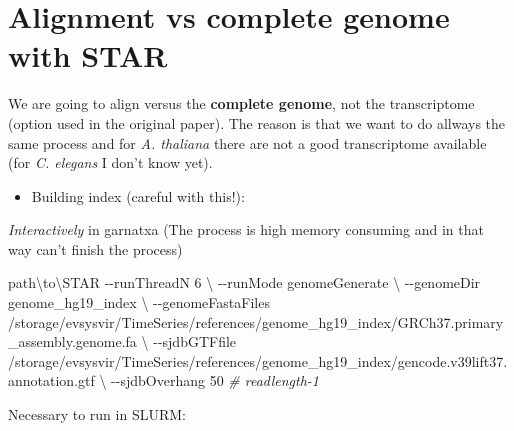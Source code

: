 \documentclass[
]{book}
\newenvironment{Shaded}{\begin{snugshade}}{\end{snugshade}}
\newcommand{\AttributeTok}[1]{\textcolor[rgb]{0.77,0.63,0.00}{#1}}
\newcommand{\CommentTok}[1]{\textcolor[rgb]{0.56,0.35,0.01}{\textit{#1}}}
\newcommand{\DataTypeTok}[1]{\textcolor[rgb]{0.13,0.29,0.53}{#1}}
\newcommand{\ExtensionTok}[1]{#1}
\newcommand{\NormalTok}[1]{#1}
\providecommand{\tightlist}{%
  \setlength{\itemsep}{0pt}\setlength{\parskip}{0pt}}
\begin{document}
\hypertarget{alignment-vs-complete-genome-with-star}{%
\section{Alignment vs complete genome with STAR}\label{alignment-vs-complete-genome-with-star}}

We are going to align versus the \textbf{complete genome}, not the transcriptome (option used in the original paper). The reason is that we want to do allways the same process and for \emph{A. thaliana} there are not a good transcriptome available (for \emph{C. elegans} I don't know yet).

\begin{itemize}
\tightlist
\item
  Building index (careful with this!):
\end{itemize}

\emph{Interactively} in garnatxa (The process is high memory consuming and in that way can't finish the process)

\begin{Shaded}
\begin{Highlighting}[]
\ExtensionTok{path\textbackslash{}to\textbackslash{}STAR} \AttributeTok{{-}{-}runThreadN}\NormalTok{ 6 }\DataTypeTok{\textbackslash{}}
\NormalTok{{-}{-}runMode genomeGenerate }\DataTypeTok{\textbackslash{}}
\NormalTok{{-}{-}genomeDir genome\_hg19\_index }\DataTypeTok{\textbackslash{}}
\NormalTok{{-}{-}genomeFastaFiles /storage/evsysvir/TimeSeries/references/genome\_hg19\_index/GRCh37.primary\_assembly.genome.fa }\DataTypeTok{\textbackslash{}}
\NormalTok{{-}{-}sjdbGTFfile /storage/evsysvir/TimeSeries/references/genome\_hg19\_index/gencode.v39lift37.annotation.gtf }\DataTypeTok{\textbackslash{}}
\NormalTok{{-}{-}sjdbOverhang 50 }\CommentTok{\# readlength{-}1}
\end{Highlighting}
\end{Shaded}

Necessary to run in SLURM:
\end{document}
